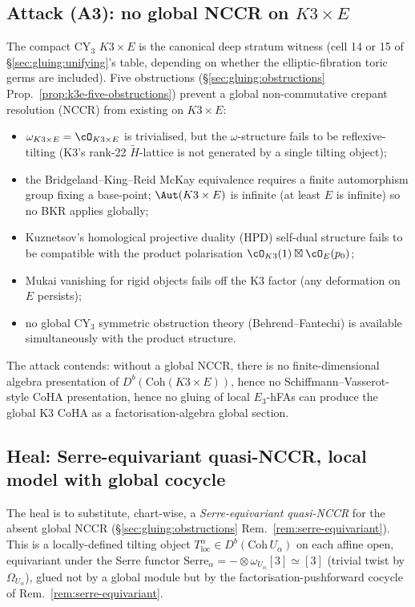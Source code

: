 \subsection*{Attack (A3): no global NCCR on $K3\times E$}

The compact CY$_3$ $K3 \times E$ is the canonical deep stratum
witness (cell 14 or 15 of
\S\ref{sec:gluing:unifying}'s table, depending on whether the
elliptic-fibration toric germs are included). Five obstructions
(\S\ref{sec:gluing:obstructions}
Prop.~\ref{prop:k3e-five-obstructions}) prevent a global
non-commutative crepant resolution (NCCR) from existing on
$K3 \times E$:
\begin{itemize}
\item[(a)] $\omega_{K3 \times E} = \cO_{K3 \times E}$ is trivialised,
but the $\omega$-structure fails to be reflexive-tilting (K3's
rank-22 $\widetilde{H}$-lattice is not generated by a single
tilting object);
\item[(b)] the Bridgeland--King--Reid McKay equivalence requires a
finite automorphism group fixing a base-point; $\Aut(K3 \times E)$
is infinite (at least $E$ is infinite) so no BKR applies globally;
\item[(c)] Kuznetsov's homological projective duality (HPD) self-dual
structure fails to be compatible with the product polarisation
$\cO_{K3}(1) \boxtimes \cO_E(p_0)$;
\item[(d)] Mukai vanishing for rigid objects fails off the K3 factor
(any deformation on $E$ persists);
\item[(e)] no global CY$_3$ symmetric obstruction theory (Behrend--Fantechi)
is available simultaneously with the product structure.
\end{itemize}
The attack contends: without a global NCCR, there is no
finite-dimensional algebra presentation of $D^b(\mathrm{Coh}(K3 \times E))$,
hence no Schiffmann--Vasserot-style CoHA presentation, hence no
gluing of local $E_3$-hFAs can produce the global K3 CoHA as a
factorisation-algebra global section.

\subsection*{Heal: Serre-equivariant quasi-NCCR, local model with global cocycle}

The heal is to substitute, chart-wise, a \emph{Serre-equivariant
quasi-NCCR} for the absent global NCCR
(\S\ref{sec:gluing:obstructions} Rem.~\ref{rem:serre-equivariant}).
This is a locally-defined tilting object
$T_{\mathrm{loc}}^\alpha \in D^b(\mathrm{Coh}\, U_\alpha)$ on each
affine open, equivariant under the Serre functor
$\mathrm{Serre}_\alpha = - \otimes \omega_{U_\alpha}[3] \simeq [3]$
(trivial twist by $\Omega_{U_\alpha}$), glued not by a global
module but by the factorisation-pushforward cocycle of
Rem.~\ref{rem:serre-equivariant}.

